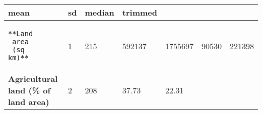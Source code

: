 \documentclass[
]{article}
\begin{document}
\begin{longtable}[]{@{}lllllll@{}}
\begin{minipage}[b]{0.12\columnwidth}
mean\strut
\end{minipage} & \begin{minipage}[b]{0.12\columnwidth}\raggedright
sd\strut
\end{minipage} & \begin{minipage}[b]{0.11\columnwidth}\raggedright
median\strut
\end{minipage} & \begin{minipage}[b]{0.11\columnwidth}\raggedright
trimmed\strut
\end{minipage}\tabularnewline
\midrule
\endhead
\begin{minipage}[t]{0.19\columnwidth}\raggedright
\begin{verbatim}
**Land
 area
 (sq
km)**
\end{verbatim}
\strut
\end{minipage} & \begin{minipage}[t]{0.08\columnwidth}\raggedright
1\strut
\end{minipage} & \begin{minipage}[t]{0.07\columnwidth}\raggedright
215\strut
\end{minipage} & \begin{minipage}[t]{0.12\columnwidth}\raggedright
592137\strut
\end{minipage} & \begin{minipage}[t]{0.12\columnwidth}\raggedright
1755697\strut
\end{minipage} & \begin{minipage}[t]{0.11\columnwidth}\raggedright
90530\strut
\end{minipage} & \begin{minipage}[t]{0.11\columnwidth}\raggedright
221398\strut
\end{minipage}\tabularnewline
\begin{minipage}[t]{0.19\columnwidth}\raggedright
\textbf{Agricultural land (\% of land area)}\strut
\end{minipage} & \begin{minipage}[t]{0.08\columnwidth}\raggedright
2\strut
\end{minipage} & \begin{minipage}[t]{0.07\columnwidth}\raggedright
208\strut
\end{minipage} & \begin{minipage}[t]{0.12\columnwidth}\raggedright
37.73\strut
\end{minipage} & \begin{minipage}[t]{0.12\columnwidth}\raggedright
22.31\strut

\end{minipage}
\end{longtable}
\end{document}
